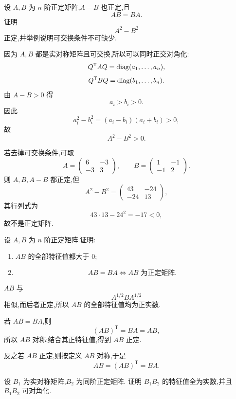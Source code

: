 \begin{example}
设 $A,B$ 为 $n$ 阶正定矩阵,$A-B$ 也正定,且
\[
AB=BA.
\]
证明
\[
A^2-B^2
\]
正定,并举例说明可交换条件不可缺少.
\end{example}
\exampleblank

\begin{solution}
因为 $A,B$ 都是实对称矩阵且可交换,所以可以同时正交对角化:
\[
Q^{\mathsf T}AQ=\operatorname{diag}(a_1,\ldots,a_n),
\]
\[
Q^{\mathsf T}BQ=\operatorname{diag}(b_1,\ldots,b_n).
\]
由 $A-B>0$ 得
\[
a_i>b_i>0.
\]
因此
\[
a_i^2-b_i^2=(a_i-b_i)(a_i+b_i)>0,
\]
故
\[
A^2-B^2>0.
\]

若去掉可交换条件,可取
\[
A=
\begin{pmatrix}
6&-3\\
-3&3
\end{pmatrix},
\qquad
B=
\begin{pmatrix}
1&-1\\
-1&2
\end{pmatrix}.
\]
则 $A,B,A-B$ 都正定,但
\[
A^2-B^2
=
\begin{pmatrix}
43&-24\\
-24&13
\end{pmatrix},
\]
其行列式为
\[
43\cdot13-24^2=-17<0,
\]
故不是正定矩阵.
\end{solution}


\begin{example}
设 $A,B$ 为 $n$ 阶正定矩阵.证明:
\begin{enumerate}
    \item $AB$ 的全部特征值都大于 $0$;
    \item
    \[
    AB=BA
    \iff
    AB\text{ 为正定矩阵}.
    \]
\end{enumerate}
\end{example}
\exampleblank

\begin{solution}
$AB$ 与
\[
A^{1/2}BA^{1/2}
\]
相似,而后者正定,所以 $AB$ 的全部特征值均为正实数.

若 $AB=BA$,则
\[
(AB)^{\mathsf T}=BA=AB,
\]
所以 $AB$ 对称;结合其正特征值,得到 $AB$ 正定.

反之若 $AB$ 正定,则按定义 $AB$ 对称,于是
\[
AB=(AB)^{\mathsf T}=BA.
\]
\end{solution}


\begin{example}
设 $B_1$ 为实对称矩阵,$B_2$ 为同阶正定矩阵.
证明 $B_1B_2$ 的特征值全为实数,并且 $B_1B_2$ 可对角化.
\end{example}
\exampleblank

